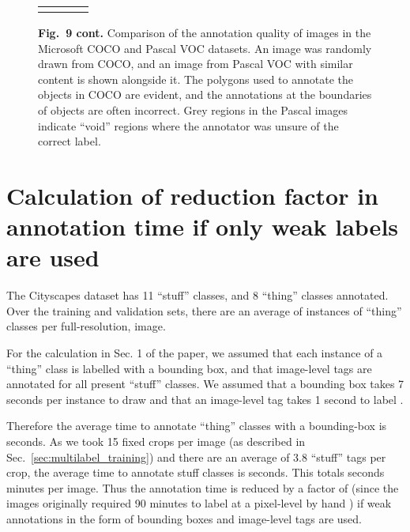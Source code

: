 \documentclass[runningheads]{llncs}
\begin{document}
\begin{figure}[!t]
\begin{tabularx}{\linewidth}{ Y Y Y Y }
\textcolor{white}{} \\

\end{tabularx}
\textbf{Fig.~9 cont.} Comparison of the annotation quality of images in the Microsoft COCO and Pascal VOC datasets. An image was randomly drawn from COCO, and an image from Pascal VOC with similar content is shown alongside it.
The polygons used to annotate the objects in COCO are evident, and the annotations at the boundaries of objects are often incorrect.
Grey regions in the Pascal images indicate ``void'' regions where the annotator was unsure of the correct label.
\label{fig:voc_vs_coco2}
\end{figure}
  \section{Calculation of reduction factor in annotation time if only weak labels are used}
\label{sec:annotation_time}

The Cityscapes dataset has 11 ``stuff'' classes, and 8 ``thing'' classes annotated.
Over the training and validation sets, there are an average of  instances of ``thing'' classes per full-resolution,  image.

For the calculation in Sec. 1 of the paper, we assumed that each instance of a ``thing'' class is labelled with a bounding box, and that image-level tags are annotated for all present ``stuff'' classes.
We assumed that a bounding box takes 7 seconds per instance to draw \cite{papadopoulos_iccv_2017} and that an image-level tag takes 1 second to label \cite{papadopoulos_eccv_2014}.

Therefore the average time to annotate ``thing'' classes with a bounding-box is  seconds.
As we took 15 fixed crops per image (as described in Sec.~\ref{sec:multilabel_training}) and there are an average of 3.8 ``stuff'' tags per crop, the average time to annotate stuff classes is  seconds.
This totals  seconds  minutes per image.
Thus the annotation time is reduced by a factor of  (since the images originally required 90 minutes to label at a pixel-level by hand \cite{cordts_cvpr_2016}) if weak annotations in the form of bounding boxes and image-level tags are used. 
\end{document}
